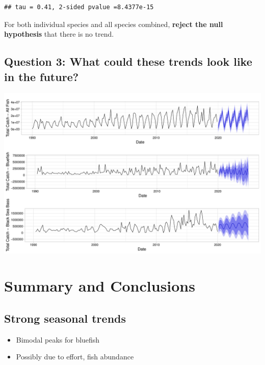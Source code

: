 \documentclass[
  12pt,
]{article}
\providecommand{\tightlist}{%
  \setlength{\itemsep}{0pt}\setlength{\parskip}{0pt}}
\begin{document}
\begin{verbatim}
## tau = 0.41, 2-sided pvalue =8.4377e-15
\end{verbatim}

For both individual species and all species combined, \textbf{reject the
null hypothesis} that there is no trend.

\hypertarget{question-3-what-could-these-trends-look-like-in-the-future}{%
\subsection{Question 3: What could these trends look like in the
future?}\label{question-3-what-could-these-trends-look-like-in-the-future}}

\includegraphics{Report_FishTrends_files/figure-latex/unnamed-chunk-9-1.pdf}

\newpage

\hypertarget{summary-and-conclusions}{%
\section{Summary and Conclusions}\label{summary-and-conclusions}}

\hypertarget{strong-seasonal-trends}{%
\subsection{Strong seasonal trends}\label{strong-seasonal-trends}}

\begin{itemize}
\tightlist
\item
  Bimodal peaks for bluefish
\item
  Possibly due to effort, fish abundance
\end{itemize}
\end{document}
